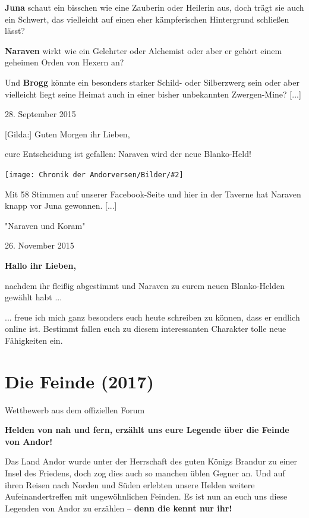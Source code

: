\documentclass[10pt, a4paper, oneside]{book}
\newcommand{\fillbreak}{\vspace*{\fill}\columnbreak}
\newcommand{\produkt}[1]{%
    \section{#1}%
    \label{Produkt: #1}%
}
\newcommand{\bildmitts}[2][height=0.32\textwidth,width=0.48\textwidth,keepaspectratio]{%
    \begin{center}
        \texttt{[image: Chronik der Andorversen/Bilder/\#2]}
    \end{center}
}
\begin{document}
\begin{multicols}{2}
\textbf{Juna} schaut ein bisschen wie eine Zauberin oder Heilerin aus, doch trägt sie auch ein Schwert, das vielleicht auf einen eher kämpferischen Hintergrund schließen lässt? 

\textbf{Naraven} wirkt wie ein Gelehrter oder Alchemist oder aber er gehört einem geheimen Orden von Hexern an?

Und \textbf{Brogg} könnte ein besonders starker Schild- oder Silberzwerg sein oder aber vielleicht liegt seine Heimat auch in einer bisher unbekannten Zwergen-Mine? [...]

\begin{center}
    28. September 2015
\end{center}

[Gilda:] Guten Morgen ihr Lieben,

eure Entscheidung ist gefallen: Naraven wird der neue Blanko-Held!

\bildmitts{Ein neuer Blanko Held 2.jpeg}

Mit 58 Stimmen auf unserer Facebook-Seite und hier in der Taverne hat Naraven knapp vor Juna gewonnen. [...]

\begin{center}
    "Naraven und Koram"

    26. November 2015
\end{center}

\textbf{Hallo ihr Lieben,}

nachdem ihr fleißig abgestimmt und Naraven zu eurem neuen Blanko-Helden gewählt habt ...

... freue ich mich ganz besonders euch heute schreiben zu können, dass er endlich online ist. Bestimmt fallen euch zu diesem interessanten Charakter tolle neue Fähigkeiten ein.






\fillbreak
\produkt{Die Feinde (2017)}

\begin{center}
    Wettbewerb aus dem offiziellen Forum
\end{center}

\textbf{Helden von nah und fern, erzählt uns eure Legende über die Feinde von Andor!}

Das Land Andor wurde unter der Herrschaft des guten Königs Brandur zu einer Insel des Friedens, doch zog dies auch so manchen üblen Gegner an. Und auf ihren Reisen nach Norden und Süden erlebten unsere Helden weitere Aufeinandertreffen mit ungewöhnlichen Feinden. Es ist nun an euch uns diese Legenden von Andor zu erzählen – \textbf{denn die kennt nur ihr!}


\end{multicols}
\end{document}
